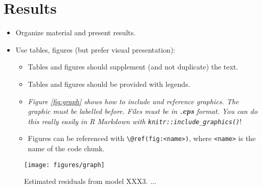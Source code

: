 \documentclass[11pt, a4paper, twosided]{book}
\begin{document}
\hypertarget{results}{%
\chapter{Results}\label{results}}
\begin{itemize}
\item
  Organize material and present results.
\item
  Use tables, figures (but prefer visual presentation):
  \begin{itemize}
  \item
    Tables and figures should supplement (and not duplicate) the text.
  \item
    Tables and figures should be provided with legends.
  \item
    \emph{Figure \ref{fig:graph} shows how to include and reference graphics.
    The graphic must be labelled before. Files must be in \textbf{.eps} format. You
    can do this really easily in R Markdown with \texttt{knitr::include\_graphics()}}!
  \item
    Figures can be referenced with \texttt{\textbackslash{}@ref(fig:\textless{}name\textgreater{})}, where \texttt{\textless{}name\textgreater{}} is the
    name of the code chunk.
  \end{itemize}
\end{itemize}
\begin{figure}

{\centering \texttt{[image: figures/graph]} 

}

\caption{Estimated residuals from model XXX3. ...}\label{fig:graph3}
\end{figure}
\end{document}
